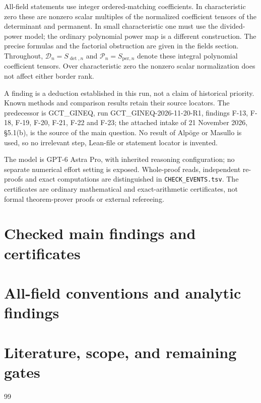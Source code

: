 \documentclass[11pt]{article}
\begin{document}
All-field statements use integer ordered-matching coefficients.
In characteristic zero these are nonzero scalar multiples of the
normalized coefficient tensors of the determinant and permanent.
In small characteristic one must use the divided-power model;
the ordinary polynomial power map is a different construction.
The precise formulas and the factorial obstruction are given in
the fields section. Throughout, $\mathcal D_n=S_{\det,n}$ and
$\mathcal P_n=S_{\mathrm{per},n}$ denote these integral polynomial
coefficient tensors. Over characteristic zero the nonzero scalar
normalization does not affect either border rank.

A finding is a deduction established in this run, not a claim of
historical priority. Known methods and comparison results retain
their source locators. The predecessor is GCT\_GINEQ,
run GCT\_GINEQ-2026-11-20-R1, findings F-13, F-18, F-19,
F-20, F-21, F-22 and F-23; the attached intake of
21 November 2026, \S5.1(b), is the source of the main question.
No result of Alp\"oge or Masullo is used, so no irrelevant
step, Lean-file or statement locator is invented.

The model is GPT-6 Astra Pro, with inherited
reasoning configuration; no separate numerical effort setting is
exposed. Whole-proof reads, independent re-proofs and exact
computations are distinguished in \texttt{CHECK\_EVENTS.tsv}.
The certificates are ordinary mathematical and exact-arithmetic
certificates, not formal theorem-prover proofs or external refereeing.

\part{Checked main findings and certificates}



















\part{All-field conventions and analytic findings}


\part{Literature, scope, and remaining gates}



\begin{thebibliography}{99}

\end{thebibliography}
\end{document}
